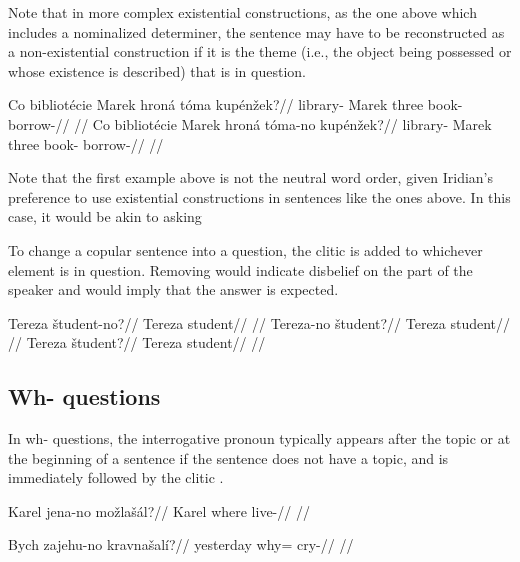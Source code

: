 Note that in more complex existential constructions, as the one above which includes a nominalized determiner, the sentence may have to be reconstructed as a non-existential construction if it is the theme (i.e., the object being possessed or whose existence is described) that is in question.

\pex
\a
\begingl
\gla Co bibliot\'ecie Marek hron\'a t\'oma kup\'en\v{z}ek?//
\glb {} library- Marek three book- borrow-//
\glft {}//
\endgl
\a
\begingl
\gla Co bibliot\'ecie Marek hron\'a t\'oma-no kup\'en\v{z}ek?//
\glb {} library- Marek three book- borrow-//
\glft {}//
\endgl
\xe

Note that the first example above is not the neutral word order, given Iridian's preference to use existential constructions in sentences like the ones above. In this case, it would be akin to asking 

To change a copular sentence into a question, the clitic  is added to whichever element is in question. Removing  would indicate disbelief on the part of the speaker and would imply that the answer  is expected.

\pex
\a
\begingl
\gla Tereza \v{s}tudent-no?//
\glb Tereza student//
\glft {}//
\endgl
\a
\begingl
\gla Tereza-no \v{s}tudent?//
\glb Tereza student//
\glft {}//
\endgl
\a
\begingl
\gla Tereza \v{s}tudent?//
\glb Tereza student//
\glft {}//
\endgl
\xe

\subsection{Wh- questions}
In wh- questions, the interrogative pronoun typically appears after the topic or at the beginning of a sentence if the sentence does not have a topic, and is immediately followed by the clitic .

\pex
\begingl
\gla Karel jena-no mo\v{z}la\v{s}\'al?//
\glb Karel where live-//
\glft {}//
\endgl
\xe

\pex
\begingl
\gla Bych zajehu-no kravna\v{s}al\'i?//
\glb yesterday why= cry-//
\glft {}//
\endgl
\xe

